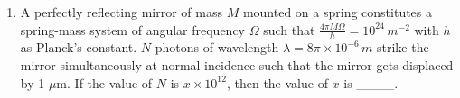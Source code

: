 \documentclass{article}
\begin{document}
\begin{enumerate}
    \item A perfectly reflecting mirror of mass \( M \) mounted on a spring constitutes a spring-mass system of angular frequency \( \Omega \) such that \( \frac{4\pi M \Omega}{h} = 10^{24} \, m^{-2} \) with \( h \) as Planck's constant. \( N \) photons of wavelength \( \lambda = 8\pi \times 10^{-6} \, m \) strike the mirror simultaneously at normal incidence such that the mirror gets displaced by 1 \( \mu \)m. If the value of \( N \) is \( x \times 10^{12} \), then the value of \( x \) is \_\_\_\_. \\
    [Consider the spring as massless]
    \begin{center}
    \end{center}
\end{enumerate}
\end{document}
